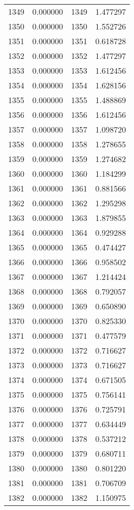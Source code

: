 \documentclass[12pt]{article}
\begin{document}
\begin{longtable}{@{}cccc@{}}
1349 & 0.000000 & 1349 & 1.477297 \\
1350 & 0.000000 & 1350 & 1.552726 \\
1351 & 0.000000 & 1351 & 0.618728 \\
1352 & 0.000000 & 1352 & 1.477297 \\
1353 & 0.000000 & 1353 & 1.612456 \\
1354 & 0.000000 & 1354 & 1.628156 \\
1355 & 0.000000 & 1355 & 1.488869 \\
1356 & 0.000000 & 1356 & 1.612456 \\
1357 & 0.000000 & 1357 & 1.098720 \\
1358 & 0.000000 & 1358 & 1.278655 \\
1359 & 0.000000 & 1359 & 1.274682 \\
1360 & 0.000000 & 1360 & 1.184299 \\
1361 & 0.000000 & 1361 & 0.881566 \\
1362 & 0.000000 & 1362 & 1.295298 \\
1363 & 0.000000 & 1363 & 1.879855 \\
1364 & 0.000000 & 1364 & 0.929288 \\
1365 & 0.000000 & 1365 & 0.474427 \\
1366 & 0.000000 & 1366 & 0.958502 \\
1367 & 0.000000 & 1367 & 1.214424 \\
1368 & 0.000000 & 1368 & 0.792057 \\
1369 & 0.000000 & 1369 & 0.650890 \\
1370 & 0.000000 & 1370 & 0.825330 \\
1371 & 0.000000 & 1371 & 0.477579 \\
1372 & 0.000000 & 1372 & 0.716627 \\
1373 & 0.000000 & 1373 & 0.716627 \\
1374 & 0.000000 & 1374 & 0.671505 \\
1375 & 0.000000 & 1375 & 0.756141 \\
1376 & 0.000000 & 1376 & 0.725791 \\
1377 & 0.000000 & 1377 & 0.634449 \\
1378 & 0.000000 & 1378 & 0.537212 \\
1379 & 0.000000 & 1379 & 0.680711 \\
1380 & 0.000000 & 1380 & 0.801220 \\
1381 & 0.000000 & 1381 & 0.706709 \\
1382 & 0.000000 & 1382 & 1.150975 \\

\end{longtable}
\end{document}
